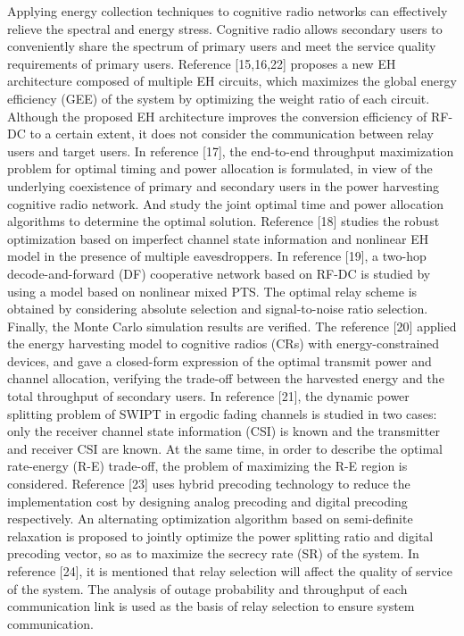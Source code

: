 \documentclass[conference]{IEEEtran}
\begin{document}
Applying energy collection techniques to cognitive radio networks can effectively relieve the spectral and energy stress. Cognitive radio allows secondary users to conveniently share the spectrum of primary users and meet the service quality requirements of primary users. 
Reference [15,16,22] proposes a new EH architecture composed of multiple EH circuits, which maximizes the global energy efficiency (GEE) of the system by optimizing the weight ratio of each circuit. Although the proposed EH architecture improves the conversion efficiency of RF-DC to a certain extent, it does not consider the communication between relay users and target users. 
In reference [17], the end-to-end throughput maximization problem for optimal timing and power allocation is formulated, in view of the underlying coexistence of primary and secondary users in the power harvesting cognitive radio network. And study the joint optimal time and power allocation algorithms to determine the optimal solution. 
Reference [18] studies the robust optimization based on imperfect channel state information and nonlinear EH model in the presence of multiple eavesdroppers.
In reference [19], a two-hop decode-and-forward (DF) cooperative network based on RF-DC is studied by using a model based on nonlinear mixed PTS. The optimal relay scheme is obtained by considering absolute selection and signal-to-noise ratio selection. Finally, the Monte Carlo simulation results are verified.
The reference [20] applied the energy harvesting model to cognitive radios (CRs) with energy-constrained devices, and gave a closed-form expression of the optimal transmit power and channel allocation, verifying the trade-off between the harvested energy and the total throughput of secondary users.
In reference [21], the dynamic power splitting problem of SWIPT in ergodic fading channels is studied in two cases: only the receiver channel state information (CSI) is known and the transmitter and receiver CSI are known. At the same time, in order to describe the optimal rate-energy (R-E) trade-off, the problem of maximizing the R-E region is considered.
Reference [23] uses hybrid precoding technology to reduce the implementation cost by designing analog precoding and digital precoding respectively. An alternating optimization algorithm based on semi-definite relaxation is proposed to jointly optimize the power splitting ratio and digital precoding vector, so as to maximize the secrecy rate (SR) of the system.
In reference [24], it is mentioned that relay selection will affect the quality of service of the system. The analysis of outage probability and throughput of each communication link is used as the basis of relay selection to ensure system communication. 
\end{document}
